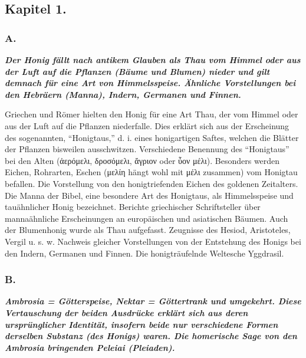 \documentclass[a4paper, 11pt, oneside]{article}
\begin{document}
\subsection*{Kapitel 1.}

\subsubsection*{A.}

\textbf{\emph{Der Honig fällt nach antikem Glauben als Thau vom Himmel oder aus der Luft auf die Pflanzen (Bäume und Blumen) nieder und gilt demnach für eine Art von Himmelsspeise. Ähnliche Vorstellungen bei den Hebräern (Manna), Indern, Germanen und Finnen.}}

Griechen und Römer hielten den Honig für eine Art Thau, der vom Himmel oder aus der Luft auf die Pflanzen niederfalle. Dies erklärt sich aus der Erscheinung des sogenannten, "`Honigtaus,"' d. i. eines honigartigen Saftes, welchen die Blätter der Pflanzen bisweilen ausschwitzen. Verschiedene Benennung des "`Honigtaus"' bei den Alten (ἀερόμελι, δροσόμελι, ἄγριον oder ὗον μέλι). Besonders werden Eichen, Rohrarten, Eschen (μελίη hängt wohl mit μέλι zusammen) vom Honigtau befallen. Die Vorstellung von den honigtriefenden Eichen des goldenen Zeitalters. Die Manna der Bibel, eine besondere Art des Honigtaus, als Himmelsspeise und tauähnlicher Honig bezeichnet. Berichte griechischer Schriftsteller über mannaähnliche Erscheinungen an europäischen und asiatischen Bäumen. Auch der Blumenhonig wurde als Thau aufgefasst. Zeugnisse des Hesiod, Aristoteles, Vergil u. s. w. Nachweis gleicher Vorstellungen von der Entstehung des Honigs bei den Indern, Germanen und Finnen. Die honigträufelnde Weltesche Yggdrasil.

\subsubsection*{B.}

\textbf{\emph{Ambrosia = Götterspeise, Nektar = Göttertrank und umgekehrt. Diese Vertauschung der beiden Ausdrücke erklärt sich aus deren ursprünglicher Identität, insofern beide nur verschiedene Formen derselben Substanz (des Honigs) waren. Die homerische Sage von den Ambrosia bringenden Peleiai (Pleiaden).}}
\end{document}
